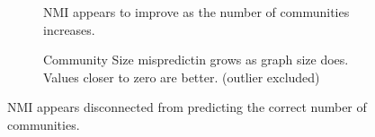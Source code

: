 \begin{figure}[htbp]
    \centering
    \begin{subfigure}[b]{0.45\textwidth}  %
        \centering
        \caption{NMI appears to improve as the number of communities increases.}
        \label{fig:gt-community-nmi}
    \end{subfigure}
    \hfill
    \begin{subfigure}[b]{0.45\textwidth}  %
        \centering
        \caption{Community Size mispredictin grows as graph size does. Values closer to zero are better. (outlier excluded)}
        \label{fig:gt-community-sizes}
    \end{subfigure}
    \caption{NMI appears disconnected from predicting the correct number of communities.}
    \label{fig:cd-results-effectiveness-communities}
\end{figure}